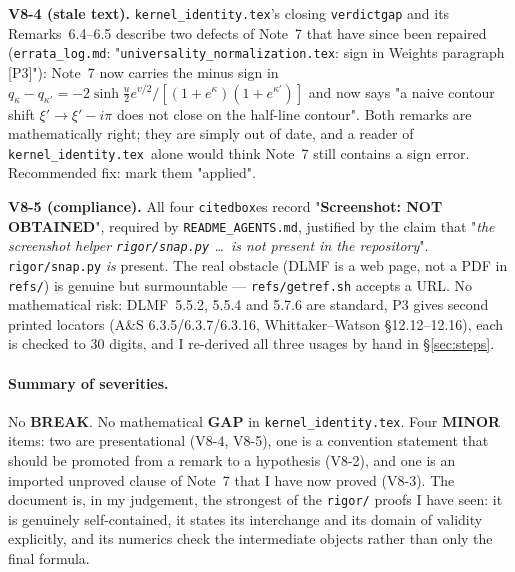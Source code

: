 \documentclass[11pt]{article}
\newcommand{\KI}{\texttt{kernel\_identity.tex}}\newcommand{\NOTE}{\texttt{universality\_normalization.tex}}
\begin{document}
\begin{verdictgap}
\textbf{V8-4 (stale text).}  \KI's closing \texttt{verdictgap} and its Remarks~6.4--6.5 describe
two defects of Note~7 that have since been repaired (\texttt{errata\_log.md}: "\NOTE: sign in
Weights paragraph [P3]"): Note~7 now carries the minus sign in
\(q_\kappa-q_{\kappa'}=-2\sinh\frac u2e^{v/2}/[(1+e^\kappa)(1+e^{\kappa'})]\) and now says "a naive
contour shift \(\xi'\to\xi'-i\pi\) does not close on the half-line contour".  Both remarks are
mathematically right; they are simply out of date, and a reader of \KI\ alone would think Note~7
still contains a sign error.  Recommended fix: mark them "applied".
\end{verdictgap}

\begin{verdictgap}
\textbf{V8-5 (compliance).}  All four \texttt{citedbox}es record "\textbf{Screenshot: NOT
OBTAINED}", required by \texttt{README\_AGENTS.md}, justified by the claim that "\emph{the
screenshot helper \texttt{rigor/snap.py} \ldots\ is not present in the repository}".
\texttt{rigor/snap.py} \emph{is} present.  The real obstacle (DLMF is a web page, not a PDF in
\texttt{refs/}) is genuine but surmountable --- \texttt{refs/getref.sh} accepts a URL.  No
mathematical risk: DLMF~5.5.2, 5.5.4 and 5.7.6 are standard, P3 gives second printed locators
(A\&S 6.3.5/6.3.7/6.3.16, Whittaker--Watson \S12.12--12.16), each is checked to 30 digits, and I
re-derived all three usages by hand in \S\ref{sec:steps}.
\end{verdictgap}

\paragraph{Summary of severities.}
No \textbf{BREAK}.  No mathematical \textbf{GAP} in \KI.  Four \textbf{MINOR} items: two are
presentational (V8-4, V8-5), one is a convention statement that should be promoted from a remark
to a hypothesis (V8-2), and one is an imported unproved clause of Note~7 that I have now proved
(V8-3).  The document is, in my judgement, the strongest of the \texttt{rigor/} proofs I have
seen: it is genuinely self-contained, it states its interchange and its domain of validity
explicitly, and its numerics check the intermediate objects rather than only the final formula.
\end{document}
